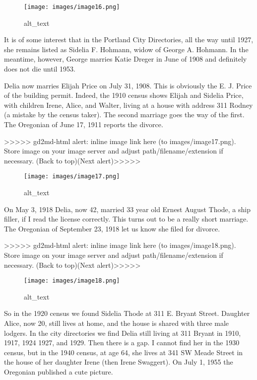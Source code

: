 \documentclass[
]{article}
\begin{document}
\begin{figure}
\centering
\texttt{[image: images/image16.png]}
\caption{alt\_text}
\end{figure}

It is of some interest that in the Portland City Directories, all the
way until 1927, she remains listed as Sidelia F. Hohmann, widow of
George A. Hohmann. In the meantime, however, George marries Katie Dreger
in June of 1908 and definitely does not die until 1953.

Delia now marries Elijah Price on July 31, 1908. This is obviously the
E. J. Price of the building permit. Indeed, the 1910 census shows Elijah
and Sidelia Price, with children Irene, Alice, and Walter, living at a
house with address 311 Rodney (a mistake by the census taker). The
second marriage goes the way of the first. The Oregonian of June 17,
1911 reports the divorce.

{\textgreater\textgreater\textgreater\textgreater\textgreater{}
gd2md-html alert: inline image link here (to images/image17.png). Store
image on your image server and adjust path/filename/extension if
necessary. }(Back to top)(Next
alert){\textgreater\textgreater\textgreater\textgreater\textgreater{} }

\begin{figure}
\centering
\texttt{[image: images/image17.png]}
\caption{alt\_text}
\end{figure}

On May 3, 1918 Delia, now 42, married 33 year old Ernest August Thode, a
ship filler, if I read the license correctly. This turns out to be a
really short marriage. The Oregonian of September 23, 1918 let us know
she filed for divorce.

{\textgreater\textgreater\textgreater\textgreater\textgreater{}
gd2md-html alert: inline image link here (to images/image18.png). Store
image on your image server and adjust path/filename/extension if
necessary. }(Back to top)(Next
alert){\textgreater\textgreater\textgreater\textgreater\textgreater{} }

\begin{figure}
\centering
\texttt{[image: images/image18.png]}
\caption{alt\_text}
\end{figure}

So in the 1920 census we found Sidelia Thode at 311 E. Bryant Street.
Daughter Alice, now 20, still lives at home, and the house is shared
with three male lodgers. In the city directories we find Delia still
living at 311 Bryant in 1910, 1917, 1924 1927, and 1929. Then there is a
gap. I cannot find her in the 1930 census, but in the 1940 census, at
age 64, she lives at 341 SW Meade Street in the house of her daughter
Irene (then Irene Swaggert). On July 1, 1955 the Oregonian published a
cute picture.
\end{document}
